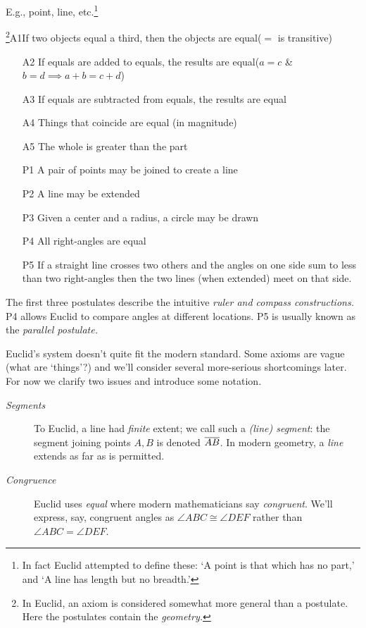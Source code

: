 
\begin{description}\itemsep0pt
	\item[\normalfont\emph{Undefined Terms}] E.g., point, line, etc.\footnote{In fact Euclid attempted to define these: `A point is that which has no part,' and `A line has length but no breadth.'}
	\item[\normalfont\emph{Axioms/Postulates}]\negthickspace\!\footnote{In Euclid, an axiom is considered somewhat more general than a postulate. Here the postulates contain the \emph{geometry.}}\lstsp A1\lstsp If two objects equal a third, then the objects are equal\hfill ($=$ is transitive)\vspace{-5pt}
	\begin{itemize}
		\item[A2] If equals are added to equals, the results are equal\hfill ($a=c$ \& $b=d\implies a+b=c+d$)
		\item[A3] If equals are subtracted from equals, the results are equal
		\item[A4] Things that coincide are equal (in magnitude)
		\item[A5] The whole is greater than the part
		\item[P1] A pair of points may be joined to create a line
		\item[P2] A line may be extended
		\item[P3] Given a center and a radius, a circle may be drawn
		\item[P4] All right-angles are equal
		\item[P5] If a straight line crosses two others and the angles on one side sum to less than two right-angles then the two lines (when extended) meet on that side.
	\end{itemize}
\end{description}

\goodbreak

The first three postulates describe the intuitive \emph{ruler and compass constructions.} P4 allows Euclid to compare angles at different locations. P5 is usually known as the \emph{parallel postulate.}
\bigbreak

Euclid's system doesn't quite fit the modern standard. Some axioms are vague (what are `things'?) and we'll consider several more-serious shortcomings later. For now we clarify two issues and introduce some notation.
\begin{description}
	\item[\normalfont\emph{Segments}] To Euclid, a line had \emph{finite} extent; we call such a \emph{(line) segment}: the segment joining points $A,B$ is denoted $\overline{AB}$. In modern geometry, a \emph{line} extends as far as is permitted.
	\item[\normalfont\emph{Congruence}] Euclid uses \emph{equal} where modern mathematicians say \emph{congruent}. We'll express, say, congruent angles as $\angle ABC\cong\angle DEF$ rather than $\angle ABC=\angle DEF$.
\end{description}


